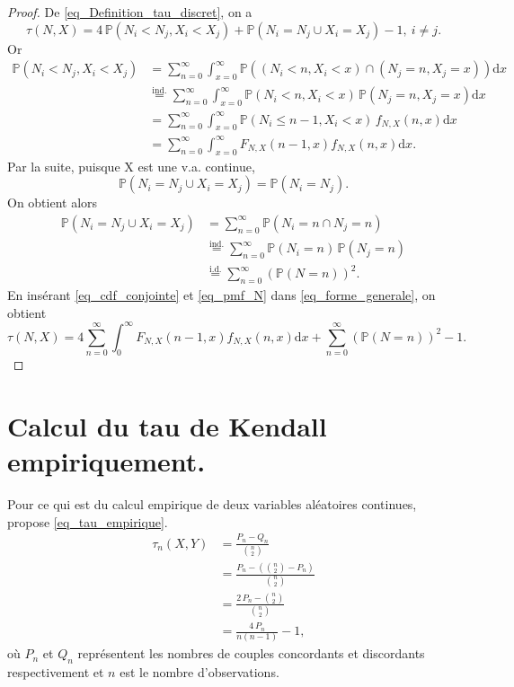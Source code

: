\documentclass{article}
\begin{document}
	\begin{proof}
		De \eqref{eq_Definition_tau_discret}, on a
		\begin{equation}\label{eq_forme_generale}
			\tau (N,X) = 4 \, \mathbb{P}(N_i < N_j, X_i < X_j) + \mathbb{P}(N_i = N_j \cup X_i = X_j) - 1 ,\ i \neq j.
		\end{equation}
		Or
		\begin{align}
			\mathbb{P}(N_i < N_j, X_i < X_j) 
			&= \sum_{n=0}^{\infty} \int_{x=0}^{\infty} \mathbb{P}((N_i < n, X_i < x) \cap (N_j = n, X_j = x))\text{d}x \nonumber \\
			&\overset{\mathrm{ind.}}{=} \sum_{n=0}^{\infty} \int_{x=0}^{\infty} \mathbb{P}(N_i < n, X_i < x) \, \mathbb{P}(N_j = n, X_j = x) \text{d}x \nonumber \\
			&= \sum_{n=0}^{\infty} \int_{x=0}^{\infty} \mathbb{P}(N_i \leq n-1, X_i < x) \, f_{N,X}(n,x) \text{d}x \nonumber \\
			&= \sum_{n=0}^{\infty} \int_{x=0}^{\infty} F_{N,X}(n-1, x) f_{N,X}(n, x) \text{d}x.
			\label{eq_cdf_conjointe}
		\end{align} 
		Par la suite, puisque X est une v.a. continue, $$\mathbb{P}(N_i = N_j \cup X_i = X_j) = \mathbb{P}(N_i = N_j).$$
		On obtient alors
		\begin{align}
			\mathbb{P}(N_i = N_j \cup X_i = X_j) 
			&= \sum_{n=0}^{\infty} \mathbb{P}(N_i = n \cap N_j = n) \nonumber \\
			&\overset{\mathrm{ind.}}{=} \sum_{n=0}^{\infty} \mathbb{P}(N_i = n) \, \mathbb{P}(N_j = n) \nonumber \\
			&\overset{\mathrm{i.d.}}{=} \sum_{n=0}^{\infty} \left(\mathbb{P}(N=n)\right)^2.
			\label{eq_pmf_N}
		\end{align}
		En insérant \eqref{eq_cdf_conjointe} et \eqref{eq_pmf_N} dans \eqref{eq_forme_generale}, on obtient
		$$\tau (N,X) = 4 \sum_{n=0}^{\infty} \int_{0}^{\infty} F_{N,X}(n-1, x) f_{N,X}(n, x) \text{d}x + \sum_{n=0}^{\infty} \left(\mathbb{P}(N=n)\right)^2 - 1.$$ 
	\end{proof}

	\section{Calcul du tau de Kendall empiriquement.}

	Pour ce qui est du calcul empirique de deux variables aléatoires continues, \cite{Everything} propose \eqref{eq_tau_empirique}.
	\begin{align}
		\tau_n(X,Y)
		&= \frac{P_n - Q_n}{ {n\choose 2} } \nonumber \\
		&=\frac{P_n - ({n\choose 2}-P_n)}{ {n\choose 2} } \nonumber \\
		&=\frac{2 \, P_n - {n\choose 2}}{ {n\choose 2} } \nonumber \\
		&= \frac{4 \, P_n}{n(n-1)} - 1, \label{eq_tau_empirique}
	\end{align}
	où $P_n$ et $Q_n$ représentent les nombres de couples concordants et discordants respectivement et $n$ est le nombre d'observations.
	
\end{document}
